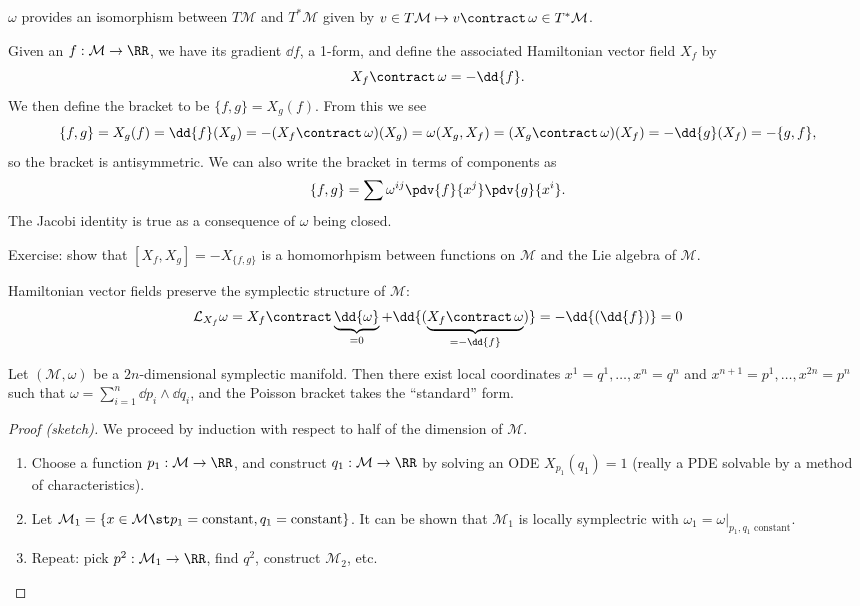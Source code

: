 \documentclass{jknotes}
\begin{document}
\(\omega\) provides an isomorphism between \(T\mathcal{M}\) and \(T^*\mathcal{M}\) given by \(v\in T\mathcal{M} \mapsto v\contract\,\omega\in T^*\mathcal{M}\).

Given an \(f:\mathcal{M}\to\RR\), we have its gradient \(\dd{f}\), a 1-form, and define the associated Hamiltonian vector field \(X_f\) by
\begin{equation}
    X_f\contract\,\omega=-\dd{f}.
\end{equation}
We then define the bracket to be \(\{f,g\}=X_g(f)\). From this we see
\begin{equation}
    \{f,g\} = X_g(f) = \dd{f}(X_g) = -(X_f\contract\,\omega)(X_g) = \omega(X_g,X_f) = (X_g\contract\,\omega)(X_f) = -\dd{g}(X_f) = -\{g,f\},
\end{equation}
so the bracket is antisymmetric. We can also write the bracket in terms of components as
\begin{equation}
    \{f,g\} = \sum \omega^{ij}\pdv{f}{x^j}\pdv{g}{x^i}.
\end{equation}
The Jacobi identity is true as a consequence of \(\omega\) being closed.

Exercise: show that \([X_f,X_g]=-X_{\{f,g\}}\) is a homomorhpism between functions on \(\mathcal{M}\) and the Lie algebra of \(\mathcal{M}\).

Hamiltonian vector fields preserve the symplectic structure of \(\mathcal{M}\):
\begin{equation}
    \mathcal{L}_{X_f}\omega = X_f \contract\underbrace{\dd{\omega}}_{=0} + \dd{(\underbrace{X_f\contract\,\omega}_{=-\dd{f}})} = -\dd{(\dd{f})} = 0
\end{equation}

\begin{theorem}[Darboux]
    Let \((\mathcal{M},\omega)\) be a \(2n\)-dimensional symplectic manifold. Then there exist local coordinates \(x^1=q^1,\dots,x^n=q^n\) and \(x^{n+1}=p^1,\dots,x^{2n}=p^n\) such that \(\omega=\sum^n_{i=1}\dd{p_i}\wedge\dd{q_i}\), and the Poisson bracket takes the ``standard'' form. 
\end{theorem}
\begin{proof}[Proof (sketch)]
    We proceed by induction with respect to half of the dimension of \(\mathcal{M}\).
    \begin{enumerate}
        \item Choose a function \(p_1:\mathcal{M}\to\RR\), and construct \(q_1:\mathcal{M}\to\RR\) by solving an ODE \(X_{p_1}(q_1)=1\) (really a PDE solvable by a method of characteristics).
        \item Let \(\mathcal{M}_1 = \{x\in\mathcal{M} \st p_1=\text{constant},q_1=\text{constant}\}\). It can be shown that \(\mathcal{M}_1\) is locally symplectric with \(\omega_1=\left.\omega\right|_{p_1,q_1\text{ constant}}\).
        \item Repeat: pick \(p^2:\mathcal{M}_1\to\RR\), find \(q^2\), construct \(\mathcal{M}_2\), etc.
    \end{enumerate}
\end{proof}
\end{document}
